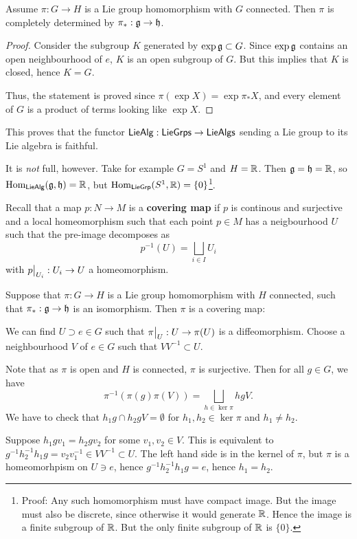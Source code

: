 \documentclass[11pt, english]{article}
\begin{document}
\begin{prop}
  Assume $\pi:G \to H$ is a Lie group homomorphism with $G$ connected. Then $\pi$ is completely determined by $\pi_\ast: \mathfrak g \to \mathfrak h$. 
\end{prop}

\begin{proof}
  Consider the subgroup $K$ generated by $\exp \mathfrak g \subset G$. Since $\exp \mathfrak g$ contains an open neighbourhood of $e$, $K$ is an open subgroup of $G$. But this implies that $K$ is closed, hence $K=G$.

Thus, the statement is proved since  $\pi(\exp X) = \exp \pi_\ast X$, and every element of $G$ is a product of terms looking like $\exp X$.
\end{proof}

\begin{remark}
  This proves that the functor $\mathsf{LieAlg}:\mathsf{LieGrps} \to \mathsf{LieAlgs}$ sending a Lie group to its Lie algebra is faithful.

It is \emph{not} full, however. Take for example $G=S^1$ and $H=\mathbb{R}$. Then $\mathfrak g = \mathfrak h = \mathbb{R}$, so $\operatorname{Hom}_{\mathsf{LieAlg}}(\mathfrak g,\mathfrak h)=\mathbb{R}$, but $\operatorname{Hom}_{\mathsf{LieGrp}}(S^1,\mathbb{R}) = \{ 0\}$\footnote{Proof: Any such homomorphism must have compact image. But the image must also be discrete, since otherwise it would generate $\mathbb{R}$. Hence the image is a finite subgroup of $\mathbb{R}$. But the only finite subgroup of $\mathbb{R}$ is $\{0 \}$.}.
\end{remark}

Recall that a map $p:N \to M$ is a \textbf{covering map} if $p$ is continous and surjective and a local homeomorphism such that each point $p \in M$ has a neigbourhood $U$ such that the pre-image decomposes as
$$
p^{-1}(U) = \bigsqcup_{i \in I} U_i
$$
with $\restr{p}{U_i}:U_i \to U$ a homeomorphism.


\begin{example}
\label{excovering}
 Suppose that $\pi:G \to H$ is a Lie group homomorphism with $H$ connected, such that $\pi_\ast: \mathfrak g \to \mathfrak h$ is an isomorphism. Then $\pi$ is a covering map:

We can find $U \supset e \in G$ such that $\restr{\pi}{U}:U \to \pi(U)$ is a diffeomorphism. Choose a neighbourhood $V$ of $e \in G$ such that $VV^{-1} \subset U$. 

Note that as $\pi$ is open and $H$ is connected, $\pi$ is surjective. Then for all $g \in G$, we have
$$
\pi^{-1}(\pi(g) \pi(V)) = \bigsqcup_{h \in \ker \pi} hg V.
$$
We have to check that $h_1g \cap h_2gV = \emptyset$ for $h_1,h_2 \in \ker \pi$ and $h_1 \neq h_2$. 

Suppose $h_1gv_1 = h_2gv_2$ for some $v_1,v_2 \in V$. This is equivalent to $g^{-1}h_2^{-1}h_1g = v_2v_1^{-1} \in VV^{-1} \subset U$. The left hand side is in the kernel of $\pi$, but $\pi$ is a homeomorhpism on $U \ni e$, hence $g^{-1}h_2^{-1}h_1 g = e$, hence $h_1= h_2$. 
\end{example}
\end{document}
